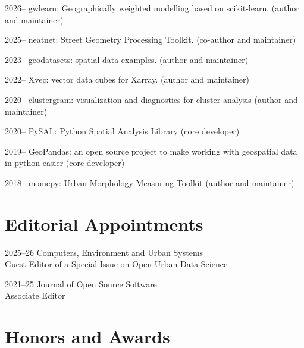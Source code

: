 \documentclass[11pt,a4paper]{report}
\begin{document}
    \begin{tablist}

        \item[2026--] \tab{}gwlearn: Geographically weighted modelling based on scikit-learn. (author and maintainer)
        \item[2025--] \tab{}neatnet: Street Geometry Processing Toolkit. (co-author and maintainer)
        \item[2023--] \tab{}geodatasets: spatial data examples. (author and maintainer)
        \item[2022--] \tab{}Xvec: vector data cubes for Xarray. (author and maintainer)
        \item[2020--] \tab{}clustergram: visualization and diagnostics for cluster analysis (author and maintainer)
        \item[2020--] \tab{}PySAL: Python Spatial Analysis Library (core developer)
        \item[2019--] \tab{}GeoPandas: an open source project to make working with geospatial data in python easier (core developer)
        \item[2018--] \tab{}momepy: Urban Morphology Measuring Toolkit (author and maintainer)

    \end{tablist}

    \section*{Editorial Appointments}

    \begin{tablist}

        \item[2025--26] \tab{}Computers, Environment and Urban Systems\\
                            Guest Editor of a Special Issue on Open Urban Data Science

        \item[2021--25] \tab{}Journal of Open Source Software \\
                            Associate Editor

    \end{tablist}

    \section*{Honors and Awards}
\end{document}
